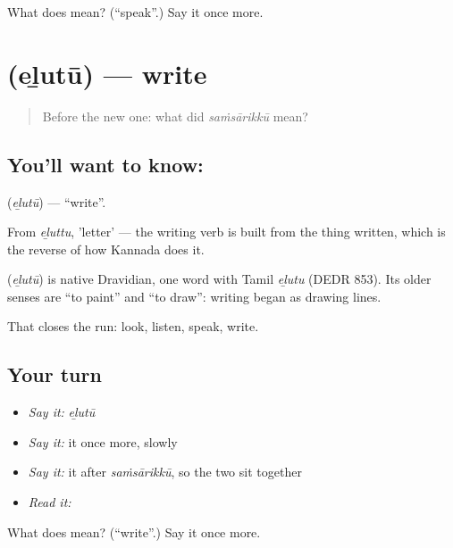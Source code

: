 \begin{tcolorbox}[breakable,colback=teal!4,colframe=teal!35!black,title={Before you move on}]
What does  mean? (\textquotedblleft{}speak\textquotedblright{}.) Say it once more.
\end{tcolorbox}
\section[\texorpdfstring{\ml{എഴുതൂ} (eḻutū)}{എഴുതൂ (eḻutū)}]{ (eḻutū) — write}

\label{lesson:ML-C44-write}



\begin{quote}
Before the new one: what did \emph{saṁsārikkū} mean?
\end{quote}

\subsection*{You'll want to know: }
\textbf{} (\emph{eḻutū}) — \textquotedblleft{}write\textquotedblright{}.

From \emph{eḻuttu}, 'letter' — the writing verb is built from the thing written, which is the reverse of how Kannada does it.

\begin{cousinweb}
\textbf{} (\emph{eḻutū}) is native Dravidian, one word with Tamil \emph{eḻutu} (DEDR 853). Its older senses are \textquotedblleft{}to paint\textquotedblright{} and \textquotedblleft{}to draw\textquotedblright{}: writing began as drawing lines.
\end{cousinweb}

\begin{grammarlens}[title={What you've built}]
That closes the run: look, listen, speak, write.
\end{grammarlens}

\subsection*{Your turn}
\begin{itemize}
\raggedright
  \item \emph{Say it:} \emph{eḻutū}
  \item \emph{Say it:} it once more, slowly
  \item \emph{Say it:} it after \emph{saṁsārikkū}, so the two sit together
  \item \emph{Read it:} \textbf{}
\end{itemize}

\begin{tcolorbox}[breakable,colback=teal!4,colframe=teal!35!black,title={Before you move on}]
What does  mean? (\textquotedblleft{}write\textquotedblright{}.) Say it once more.
\end{tcolorbox}
